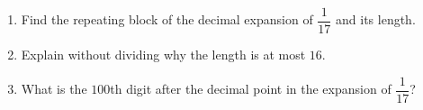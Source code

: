 \begin{enumerate}
\item[(a)] Find the repeating block of the decimal expansion of $\dfrac{1}{17}$ and its length.
\item[(b)] Explain without dividing why the length is at most $16$.
\item[(c)] What is the $100$th digit after the decimal point in the expansion of $\dfrac{1}{17}$?
\end{enumerate}
